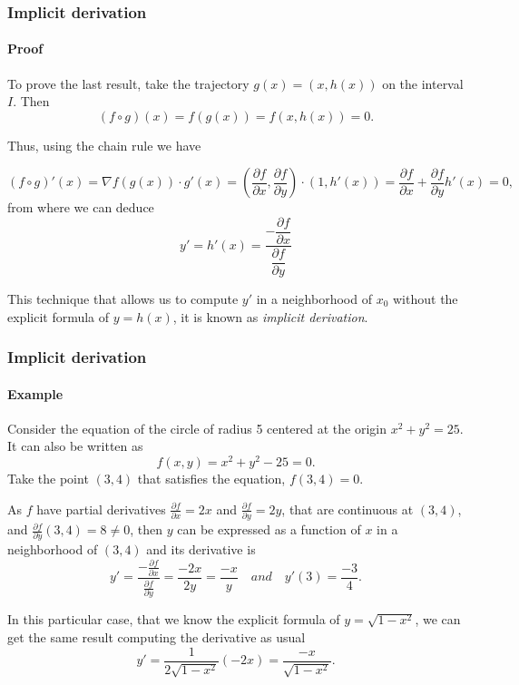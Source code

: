 \begin{frame}
\frametitle{Implicit derivation}
\framesubtitle{Proof}
To prove the last result, take the trajectory $g(x)=(x,h(x))$ on the interval $I$.
Then
\[
(f\circ g)(x) = f(g(x)) = f(x,h(x))=0.
\]

Thus, using the chain rule we have

\[
(f\circ g)'(x) = \nabla f(g(x))\cdot g'(x) = \left(\frac{\partial f}{\partial x}, \frac{\partial f}{\partial y}\right)\cdot (1,h'(x)) =
\frac{\partial f}{\partial x}+\frac{\partial f}{\partial y}h'(x) = 0,
\]
from where we can deduce
\[
y'=h'(x)=\frac{-\dfrac{\partial f}{\partial x}}{\dfrac{\partial f}{\partial y}}
\]

This technique that allows us to compute $y'$ in a neighborhood of $x_0$ without the explicit formula of $y=h(x)$, it is known as \emph{implicit derivation}.
\end{frame}


\begin{frame}
\frametitle{Implicit derivation}
\framesubtitle{Example}
Consider the equation of the circle of radius 5 centered at the origin $x^2+y^2=25$.
It can also be written as
\[
f(x,y) = x^2+y^2-25 = 0.
\]
Take the point $(3,4)$ that satisfies the equation, $f(3,4)=0$.

As $f$ have partial derivatives $\frac{\partial f}{\partial x}=2x$ and $\frac{\partial f}{\partial y}=2y$, that are continuous at $(3,4)$, and $\frac{\partial f}{\partial y}(3,4)=8\neq 0$, then $y$ can be expressed as a function of $x$ in a neighborhood of $(3,4)$ and its derivative is
\[
y'=\frac{-\frac{\partial f}{\partial x}}{\frac{\partial f}{\partial y}} = \frac{-2x}{2y}=\frac{-x}{y} \quad and \quad y'(3)=\frac{-3}{4}.
\]

In this particular case, that we know the explicit formula of $y=\sqrt{1-x^2}$, we can get the same result computing the derivative as usual
\[
y' = \frac{1}{2\sqrt{1-x^2}}(-2x) = \frac{-x}{\sqrt{1-x^2}}.
\]
\end{frame}


